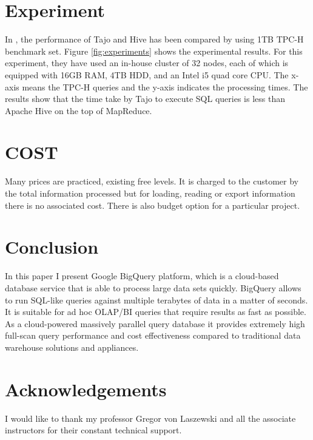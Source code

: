 \documentclass[9pt,twocolumn,twoside]{../../styles/osajnl}
\begin{document}
\section{Experiment}

\noindent
In \cite{tajo-paper}, the performance of Tajo and Hive has been
compared by using 1TB TPC-H benchmark set. Figure
\ref{fig:experiments} shows the experimental results. For this
experiment, they have used an in-house cluster of 32 nodes, each of
which is equipped with 16GB RAM, 4TB HDD, and an Intel i5 quad core
CPU. The x-axis means the TPC-H queries and the y-axis indicates the
processing times. The results show that the time take by Tajo to
execute SQL queries is less than Apache Hive on the top of MapReduce.

\section{COST}
Many prices are practiced, existing free levels. It is charged to the
customer by the total information processed but for loading, reading or
export information there is no associated cost.  There is also budget
option for a particular project.

\section{Conclusion}
In this paper I present Google BigQuery platform, which is a
cloud-based database service that is able to process large data sets
quickly. BigQuery allows to run SQL-like queries against multiple
terabytes of data in a matter of seconds. It is suitable for ad hoc
OLAP/BI queries that require results as fast as possible. As a
cloud-powered massively parallel query database it provides extremely
high full-scan query performance and cost effectiveness compared to
traditional data warehouse solutions and appliances.

\section*{Acknowledgements}

I would like to thank my professor Gregor von Laszewski and all the
associate instructors for their constant technical support.



 
\newpage

\appendix
\end{document}
